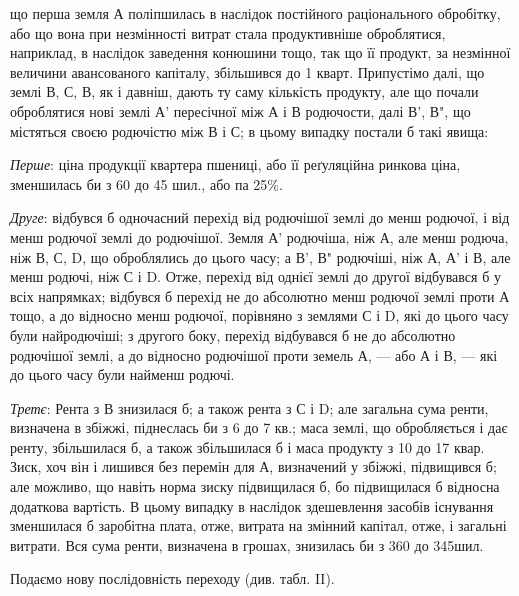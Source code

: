 \parcont{}  %
що перша земля А поліпшилась в наслідок постійного раціонального обробітку,
або що вона при незмінності витрат стала продуктивніше оброблятися,
наприклад, в наслідок заведення конюшини тощо, так що її продукт, за незмінної
величини авансованого капіталу, збільшився до 1 кварт. Припустімо
далі, що землі В, С, В, як і давніш, дають ту саму кількість продукту, але що
почали оброблятися нові землі А' пересічної між А і В родючости, далі В', В", що
містяться своєю родючістю між В і С; в цьому випадку постали б такі явища:

\emph{Перше}: ціна продукції квартера пшениці, або її реґуляційна ринкова
ціна, зменшилась би з 60 до 45 шил., або па 25\%.

\emph{Друге}: відбувся б одночасний перехід від родючішої землі до менш
родючої, і від менш родючої землі до родючішої. Земля А' родючіша, ніж А, але
менш родюча, ніж В, С, D, що оброблялись до цього часу; а В', В" родючіші, ніж
А, А' і В, але менш родючі, ніж С і D. Отже, перехід від однієї землі до другої
відбувався б у всіх напрямках; відбувся б перехід не до абсолютно
менш родючої землі проти А тощо, а до відносно менш родючої, порівняно
з землями С і D, які до цього часу були найродючіші; з другого боку, перехід
відбувався б не до абсолютно родючішої землі, а до відносно родючішої проти
земель А, — або А і В, — які до цього часу були найменш родючі.

\emph{Третє}: Рента з В знизилася б; а також рента з С і D; але загальна
сума ренти, визначена в збіжжі, піднеслась би з 6 до 7 кв.; маса землі, що
обробляється і дає ренту, збільшилася б, а також збільшилася б і маса продукту
з 10 до 17 квар. Зиск, хоч він і лишився без перемін для А, визначений у
збіжжі, підвищився б; але можливо, що навіть норма зиску підвищилася б, бо
підвищилася б відносна додаткова вартість. В цьому випадку в наслідок здешевлення
засобів існування зменшилася б заробітна плата, отже, витрата на змінний капітал,
отже, і загальні витрати. Вся сума ренти, визначена в грошах, знизилась би з 360 до 345шил.

Подаємо нову послідовність переходу
(див. табл. II).

